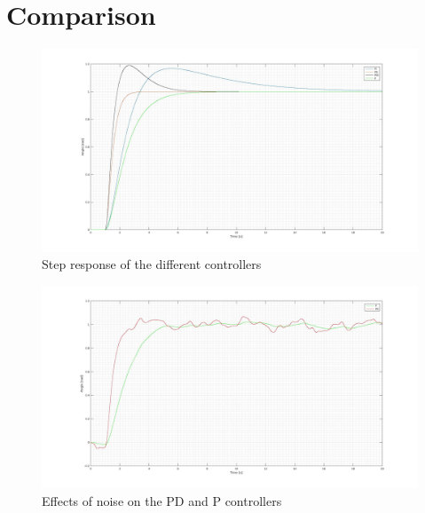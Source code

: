 \section{Comparison}

\begin{figure}[H]
\centering
\includegraphics[scale=0.2]{figures/comp_full.jpg}
\caption{Step response of the different controllers}
\label{dcmotor_circuit}
\end{figure}

\begin{figure}[H]
\centering
\includegraphics[scale=0.2]{figures/comp_PDP.jpg}
\caption{Effects of noise on the PD and P controllers}
\label{dcmotor_circuit}
\end{figure}

